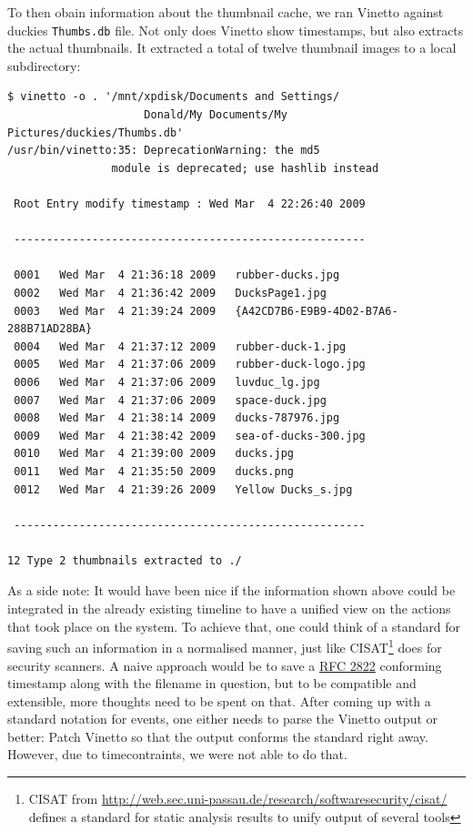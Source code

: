 \documentclass[a4paper,
    11pt,
    normalheadings,
    parindent,
    UKenglish,
    abstracton,
    ]{scrartcl}
\begin{document}
To then obain information about the thumbnail cache, we ran Vinetto against duckies \texttt{Thumbs.db} file.
Not only does Vinetto show timestamps, but also extracts the actual thumbnails. It extracted a total of twelve thumbnail images to a local subdirectory:
\begin{verbatim}
$ vinetto -o . '/mnt/xpdisk/Documents and Settings/
                     Donald/My Documents/My Pictures/duckies/Thumbs.db'
/usr/bin/vinetto:35: DeprecationWarning: the md5
                module is deprecated; use hashlib instead

 Root Entry modify timestamp : Wed Mar  4 22:26:40 2009

 ------------------------------------------------------

 0001   Wed Mar  4 21:36:18 2009   rubber-ducks.jpg
 0002   Wed Mar  4 21:36:42 2009   DucksPage1.jpg
 0003   Wed Mar  4 21:39:24 2009   {A42CD7B6-E9B9-4D02-B7A6-288B71AD28BA}
 0004   Wed Mar  4 21:37:12 2009   rubber-duck-1.jpg
 0005   Wed Mar  4 21:37:06 2009   rubber-duck-logo.jpg
 0006   Wed Mar  4 21:37:06 2009   luvduc_lg.jpg
 0007   Wed Mar  4 21:37:06 2009   space-duck.jpg
 0008   Wed Mar  4 21:38:14 2009   ducks-787976.jpg
 0009   Wed Mar  4 21:38:42 2009   sea-of-ducks-300.jpg
 0010   Wed Mar  4 21:39:00 2009   ducks.jpg
 0011   Wed Mar  4 21:35:50 2009   ducks.png
 0012   Wed Mar  4 21:39:26 2009   Yellow Ducks_s.jpg

 ------------------------------------------------------

12 Type 2 thumbnails extracted to ./
\end{verbatim}



As a side note: It would have been nice if the information shown above could be integrated in the already existing timeline to have a unified view on the actions that took place on the system.
To achieve that, one could think of a standard for saving such an information in a normalised manner, just like CISAT\footnote{CISAT from \url{http://web.sec.uni-passau.de/research/softwaresecurity/cisat/} defines a standard for static analysis results to unify output of several tools} does for security scanners.
A naive approach would be to save a \href{http://www.ietf.org/rfc/rfc2822.txt}{RFC 2822} conforming timestamp along with the filename in question, but to be compatible and extensible, more thoughts need to be spent on that.
After coming up with a standard notation for events, one either needs to parse the Vinetto output or better: Patch Vinetto so that the output conforms the standard right away.
However, due to timecontraints, we were not able to do that.
\end{document}
